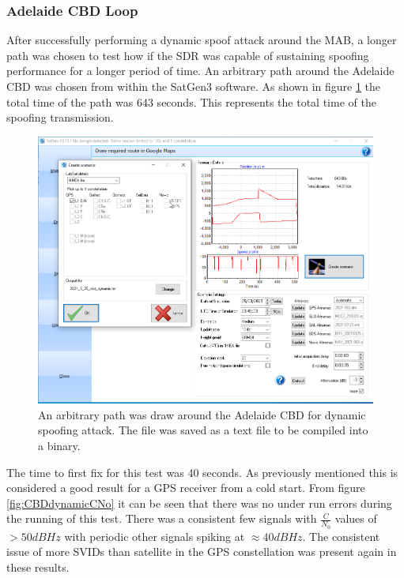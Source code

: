 \subsubsection{Adelaide CBD Loop}
After successfully performing a dynamic spoof attack around the MAB, a longer path was chosen to test how if the SDR was capable of sustaining spoofing performance for a
longer period of time. An arbitrary path around the Adelaide CBD was chosen from within the SatGen3 software. As shown in figure \ref{fig:CBDdynamicSetup} the total time of the path was 643 seconds. This represents the total time of the spoofing transmission.

\begin{figure}[!h]
    \begin{centering}
        \includegraphics[width=12cm,keepaspectratio]{Figures/21-3-25_cbd_dynamic_longloop_setup.png}
        \caption{An arbitrary path was draw around the Adelaide CBD for dynamic spoofing attack. The file was saved as a text file to be compiled into a binary.}
        \label{fig:CBDdynamicSetup}
    \end{centering}
\end{figure}

The time to first fix for this test was 40 seconds. As previously mentioned this is considered a good result for a GPS receiver from a cold start. From figure
\ref{fig:CBDdynamicCNo} it can be seen that there was no under run errors during the running of this test. There was a consistent few signals with $\frac{C}{N_0}$ values
of $>50dBHz$ with periodic other signals spiking at $\approx 40dBHz$.
The consistent issue of more SVIDs than satellite in the GPS constellation was present again in these results.

